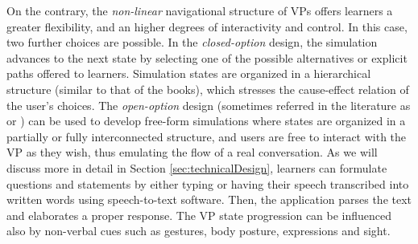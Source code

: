 On the contrary, the \emph{non-linear} navigational structure of VPs offers learners a greater flexibility, and an higher degrees of interactivity and control. In this case, two further choices are possible. In the \textit{closed-option} design, the simulation advances to the next state by selecting one of the possible alternatives or explicit paths offered to learners. Simulation states are organized in a hierarchical structure (similar to that of the  books), which stresses the cause-effect relation of the user's choices. 
The \textit{open-option} design (sometimes referred in the literature as  \cite{jacklin2019virtual,janda2004simulation,mccoy2016evaluating}  or  \cite{hirumi2016advancing}) can be used to develop  free-form simulations where states are organized in a partially or fully interconnected structure, and users are free to interact with the VP as they wish, thus emulating the flow of a real conversation. As we will discuss  more in detail in Section \ref{sec:technicalDesign}, learners can formulate questions and statements by either typing or having their speech transcribed into written words using speech-to-text software. Then, the application parses the text and elaborates a proper response. The VP state progression can be influenced also by non-verbal cues such as gestures, body posture, expressions and sight.




